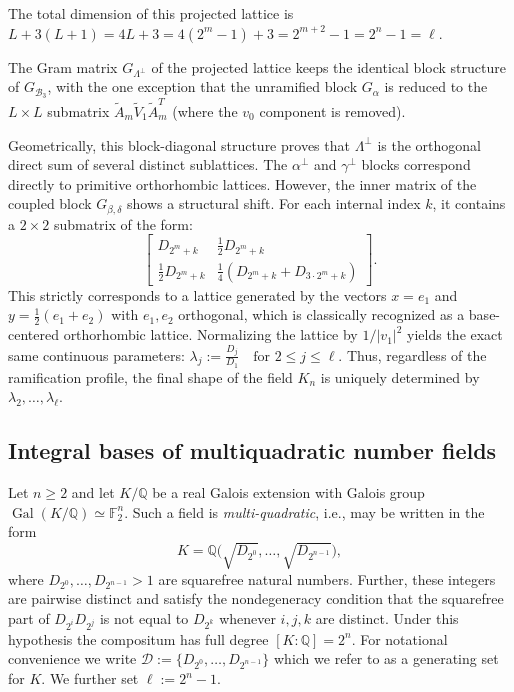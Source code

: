 \documentclass{amsart}
\newcommand{\Q}{\mathbb{Q}}
\newcommand{\F}{\mathbb{F}}
\newcommand{\op}[1]{\operatorname{#1}}
\theoremstyle{plain}
\theoremstyle{definition}
\theoremstyle{remark}
\numberwithin{equation}{section}
\begin{document}
The total dimension of this projected lattice is $L + 3(L+1) = 4L + 3 = 4(2^m - 1) + 3 = 2^{m+2} - 1 = 2^n - 1 = \ell$.

The Gram matrix $G_{\Lambda^\perp}$ of the projected lattice keeps the identical block structure of $G_{\mathcal{B}_3}$, with the one exception that the unramified block $G_\alpha$ is reduced to the $L \times L$ submatrix $\tilde{A}_m \tilde{V}_1 \tilde{A}_m^T$ (where the $v_0$ component is removed).



Geometrically, this block-diagonal structure proves that $\Lambda^\perp$ is the orthogonal direct sum of several distinct sublattices. The $\alpha^\perp$ and $\gamma^\perp$ blocks correspond directly to primitive orthorhombic lattices. However, the inner matrix of the coupled block $G_{\beta, \delta}$ shows a structural shift. For each internal index $k$, it contains a $2 \times 2$ submatrix of the form:
\[
    \begin{bmatrix} D_{2^m+k} & \frac{1}{2} D_{2^m+k} \\ \frac{1}{2} D_{2^m+k} & \frac{1}{4}(D_{2^m+k} + D_{3\cdot 2^m+k}) \end{bmatrix}.
\]
This strictly corresponds to a lattice generated by the vectors $x = e_1$ and $y = \frac{1}{2}(e_1 + e_2)$ with $e_1, e_2$ orthogonal, which is classically recognized as a base-centered orthorhombic lattice. 
Normalizing the lattice by $1/|v_1|^2$ yields the exact same continuous parameters:   $ \lambda_j := \frac{D_j}{D_1} \quad \text{for } 2 \leq j \leq \ell.$
Thus, regardless of the ramification profile, the final shape of the field $K_n$ is uniquely determined by $\lambda_2, \ldots, \lambda_\ell$.








\iffalse
\subsection{Integral bases of multiquadratic number fields}
\par
Let $n \ge 2$ and let $K/\Q$ be a real Galois extension with Galois group
$\op{Gal}(K/\Q)\simeq \F_2^n$. 
Such a field is \emph{multi-quadratic}, i.e., may be written in the form
\begin{equation}\label{defn of K} K=\Q\bigl(\sqrt{D_{2^0}},\ldots,\sqrt{D_{2^{n-1}}}\bigr),
\end{equation}
where $D_{2^0},\ldots,D_{2^{n-1}}>1$ are squarefree natural numbers. Further, these integers are pairwise distinct and satisfy the nondegeneracy condition that the squarefree part of $D_{2^i}D_{2^j}$ is not equal to $D_{2^k}$ whenever $i,j,k$ are distinct.  
Under this hypothesis the compositum has full degree $[K:\Q]=2^n$. For notational convenience we write $\mathcal D := \{D_{2^0},\ldots,D_{2^{n-1}}\}$ which we refer to as a generating set for $K$. We further set $\ell := 2^n-1$.
\end{document}

